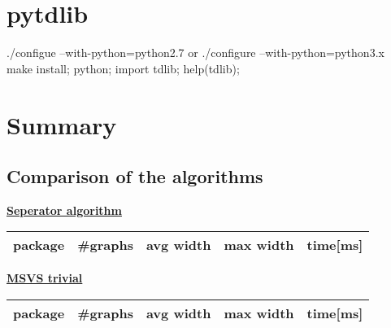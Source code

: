 \documentclass[a4wide]{article}
\begin{document}
\newpage

\section{pytdlib}

./configue --with-python=python2.7 or ./configure --with-python=python3.x \\

make install; python; import tdlib; help(tdlib);

\newpage

\section{Summary}

\subsection{Comparison of the algorithms}

\vspace*{0.5cm}


\begin{minipage}{0.2\textwidth}
\underline{\textbf{Seperator algorithm}} \\
\small{
\begin{tabular}{|l|l|l|l|l|}
\hline
package & \#graphs & avg width & max width & time[ms] \\
\hline
\hline

\hline
\end{tabular}
}
\end{minipage}
\hspace{6.5cm}
\begin{minipage}{0.2\textwidth}
\underline{\textbf{MSVS trivial}} \\
\small{
\begin{tabular}{|l|l|l|l|l|}
\hline
package & \#graphs & avg width & max width & time[ms] \\
\hline
\hline

\hline
\end{tabular}
}
\end{minipage}

\vspace*{0.5cm}
\end{document}
